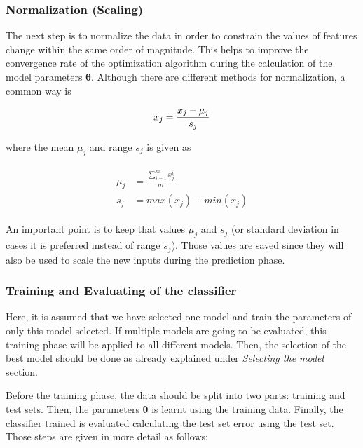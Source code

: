  \subsubsection{Normalization (Scaling)}

The next step is to normalize the data in order to constrain the values of features change within the same order of magnitude. 
This helps to improve the convergence rate of the optimization algorithm during the calculation of the model parameters $\bm{\theta}$.  
Although there are different methods for normalization, a common way is

\begin{equation}{\label{eqn:scalingFeatures}}
\bar{x}_j = \frac{x_j - \mu_j}{s_j} 
\end{equation} 

where the mean $\mu_j$ and range $s_j$ is given as

\begin{align}
\label{eqn:meandAndRange}
\begin{split}
\mu_j & = \frac{\sum\limits_{i=1}^m {x_j^i} }{m}
\\
s_j & = max(x_j) - min(x_j)
\end{split}
\end{align}

An important point is to keep that values $\mu_j$ and $s_j$ (or standard deviation in cases it is preferred instead of range $s_j$). 
Those values are saved since they will also be used to scale the new inputs during the prediction phase.


\subsubsection{Training and Evaluating of the classifier}

Here, it is assumed that we have selected one model and train the parameters of only this model selected. 
If multiple models are going to be evaluated, this training phase will be applied to all different models. 
Then, the selection of the best model should be done as already explained under \emph{Selecting the model} section.  

Before the training phase, the data should be split into two parts: training and test sets.
Then, the parameters $\bm{\theta}$ is learnt using the training data. 
Finally, the classifier trained is evaluated calculating the test set error using the test set.
Those steps are given in more detail as follows:
 
